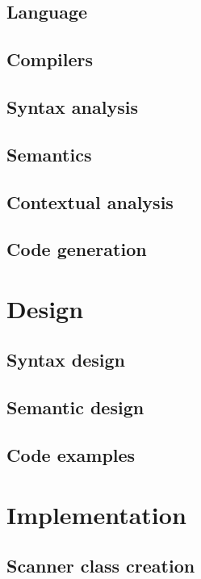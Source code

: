 	\section{Language}
	\section{Compilers}
	
	\section{Syntax analysis}
	\section{Semantics}
	\section{Contextual analysis}
	\section{Code generation}

\renewcommand{\ind}[1]{}
\chapter{Design}
	\section{Syntax design}
	\ind{grammarchoice}
	\ind{BNF3}
	\ind{TokenSpecification}
	\section{Semantic design}
	\ind{semantics}
	\ind{TypeRules}
	\section{Code examples}

\renewcommand{\ind}[1]{}
\chapter{Implementation}
	\ind{KnownLexersAndParsers}
	\section{Scanner class creation}
